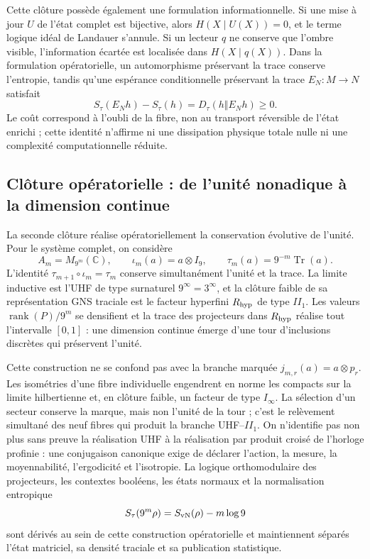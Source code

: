 Cette clôture possède également une formulation informationnelle. Si une mise à jour
\(U\) de l'état complet est bijective, alors
\(H(X\mid U(X))=0\), et le terme logique idéal de Landauer s'annule. Si un
lecteur \(q\) ne conserve que l'ombre visible, l'information écartée est
localisée dans \(H(X\mid q(X))\). Dans la formulation opératorielle, un automorphisme
préservant la trace conserve l'entropie, tandis qu'une espérance conditionnelle
préservant la trace \(E_N:M\to N\) satisfait
\[
 S_\tau(E_Nh)-S_\tau(h)=D_\tau(h\Vert E_Nh)\geq0.
\]
Le coût correspond à l'oubli de la fibre, non au transport réversible de
l'état enrichi ; cette identité n'affirme ni une dissipation physique totale nulle ni
une complexité computationnelle réduite.

\subsection*{Clôture opératorielle : de l'unité nonadique à la dimension continue}

La seconde clôture réalise opératoriellement la conservation évolutive de
l'unité. Pour le système complet, on considère
\[
 A_m=M_{9^m}(\mathbb C),
 \qquad \iota_m(a)=a\otimes I_9,
 \qquad
 \tau_m(a)=9^{-m}\operatorname{Tr}(a).
\]
L'identité \(\tau_{m+1}\circ\iota_m=\tau_m\) conserve simultanément
l'unité et la trace. La limite inductive est l'UHF de type surnaturel
\(9^\infty=3^\infty\), et la clôture faible de sa représentation GNS traciale est
le facteur hyperfini \(R_{\rm hyp}\) de type \(II_1\). Les valeurs
\(\operatorname{rank}(P)/9^m\) se densifient et la trace des projecteurs dans
\(R_{\rm hyp}\) réalise tout l'intervalle \([0,1]\) : une dimension continue
émerge d'une tour d'inclusions discrètes qui préservent l'unité.

Cette construction ne se confond pas avec la branche marquée
\(j_{m,r}(a)=a\otimes p_r\). Les isométries d'une fibre individuelle engendrent en
norme les compacts sur la limite hilbertienne et, en clôture faible, un facteur
de type \(I_\infty\). La sélection d'un secteur conserve la marque, mais non
l'unité de la tour ; c'est le relèvement simultané des neuf fibres qui
produit la branche UHF--\(II_1\). On n'identifie pas non plus sans preuve la réalisation
UHF à la réalisation par produit croisé de l'horloge profinie : une
conjugaison canonique exige de déclarer l'action, la mesure, la moyennabilité,
l'ergodicité et l'isotropie. La logique orthomodulaire des projecteurs, les contextes
booléens, les états normaux et la normalisation entropique
\[
 S_\tau(9^m\rho)=S_{\rm vN}(\rho)-m\log9
\]
sont dérivés au sein de cette construction opératorielle et maintiennent séparés
l'état matriciel, sa densité traciale et sa publication statistique.

